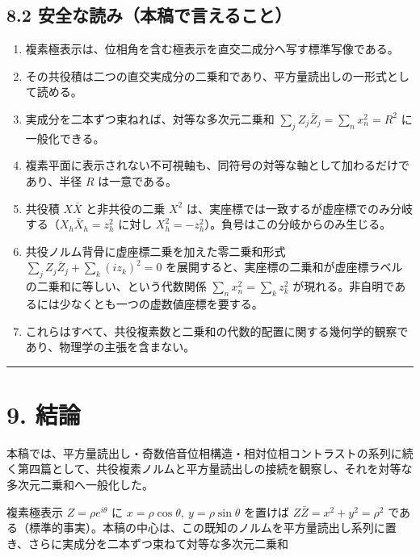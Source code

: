 \documentclass[11pt,a4paper]{ltjsarticle}
\providecommand{\tightlist}{\setlength{\itemsep}{0pt}\setlength{\parskip}{0pt}}
\begin{document}
\subsection{8.2
安全な読み（本稿で言えること）}\label{ux5b89ux5168ux306aux8aadux307fux672cux7a3fux3067ux8a00ux3048ux308bux3053ux3068}

\begin{enumerate}
\def\labelenumi{\arabic{enumi}.}
\tightlist
\item
  複素極表示は、位相角を含む極表示を直交二成分へ写す標準写像である。
\item
  その共役積は二つの直交実成分の二乗和であり、平方量読出しの一形式として読める。
\item
  実成分を二本ずつ束ねれば、対等な多次元二乗和
  \(\sum_j Z_j\bar Z_j=\sum_n x_n^2=R^2\) に一般化できる。
\item
  複素平面に表示されない不可視軸も、同符号の対等な軸として加わるだけであり、半径
  \(R\) は一意である。
\item
  共役積 \(X\bar X\) と非共役の二乗 \(X^2\)
  は、実座標では一致するが虚座標でのみ分岐する（\(X_h\bar X_h=z_h^2\)
  に対し \(X_h^2=-z_h^2\)）。負号はこの分岐からのみ生じる。
\item
  共役ノルム背骨に虚座標二乗を加えた零二乗和形式
  \(\sum_j Z_j\bar Z_j+\sum_k (i z_k)^2=0\)
  を展開すると、実座標の二乗和が虚座標ラベルの二乗和に等しい、という代数関係
  \(\sum_n x_n^2=\sum_k z_k^2\)
  が現れる。非自明であるには少なくとも一つの虚数値座標を要する。
\item
  これらはすべて、共役複素数と二乗和の代数的配置に関する幾何学的観察であり、物理学の主張を含まない。
\end{enumerate}

\begin{center}\rule{0.5\linewidth}{0.5pt}\end{center}

\section{9. 結論}\label{ux7d50ux8ad6}

本稿では、平方量読出し・奇数倍音位相構造・相対位相コントラストの系列に続く第四篇として、共役複素ノルムと平方量読出しの接続を観察し、それを対等な多次元二乗和へ一般化した。

複素極表示 \(Z=\rho e^{i\theta}\) に
\(x=\rho\cos\theta,\ y=\rho\sin\theta\) を置けば
\(Z\bar Z=x^2+y^2=\rho^2\)
である（標準的事実）。本稿の中心は、この既知のノルムを平方量読出し系列に置き、さらに実成分を二本ずつ束ねて対等な多次元二乗和
\end{document}
